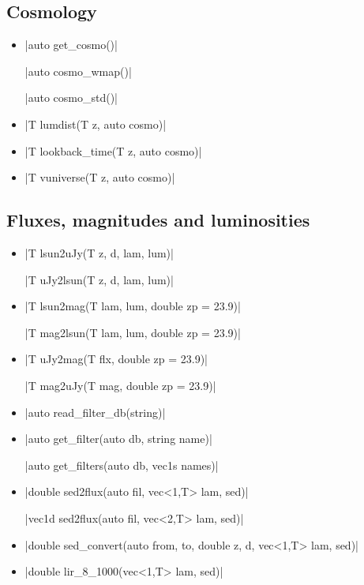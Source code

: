 \documentclass[12pt]{report}
\newcommand*\circled[1]{\tikz[baseline=(char.base)]{
            \node[shape=circle,draw,inner sep=0.0pt] (char) {#1};}}
\newcommand{\vectorfuncsym}{\circled{$\hspace{-1pt}\mathcal{V}$}\xspace}
\newcommand{\vectorfunc}{\vectorfuncsym\hspace{2pt}\xspace}
\begin{document}
\subsection{Cosmology}

\begin{itemize}
\item \cppinline|auto get_cosmo()| 

\cppinline|auto cosmo_wmap()| 

\cppinline|auto cosmo_std()| 

\item \vectorfunc \cppinline|T lumdist(T z, auto cosmo)| 

\item \vectorfunc \cppinline|T lookback_time(T z, auto cosmo)| 

\item \vectorfunc \cppinline|T vuniverse(T z, auto cosmo)| 
\end{itemize}

\subsection{Fluxes, magnitudes and luminosities}

\begin{itemize}
\item \cppinline|T lsun2uJy(T z, d, lam, lum)| 

\cppinline|T uJy2lsun(T z, d, lam, lum)| 

\item \cppinline|T lsun2mag(T lam, lum, double zp = 23.9)| 

\cppinline|T mag2lsun(T lam, lum, double zp = 23.9)| 

\item \cppinline|T uJy2mag(T flx, double zp = 23.9)| 

\cppinline|T mag2uJy(T mag, double zp = 23.9)| 

\item \cppinline|auto read_filter_db(string)| 

\item \cppinline|auto get_filter(auto db, string name)| 

\cppinline|auto get_filters(auto db, vec1s names)| 

\item \cppinline|double sed2flux(auto fil, vec<1,T> lam, sed)| 

\cppinline|vec1d sed2flux(auto fil, vec<2,T> lam, sed)|

\item \cppinline|double sed_convert(auto from, to, double z, d, vec<1,T> lam, sed)| 

\item \cppinline|double lir_8_1000(vec<1,T> lam, sed)| 
\end{itemize}
\end{document}

